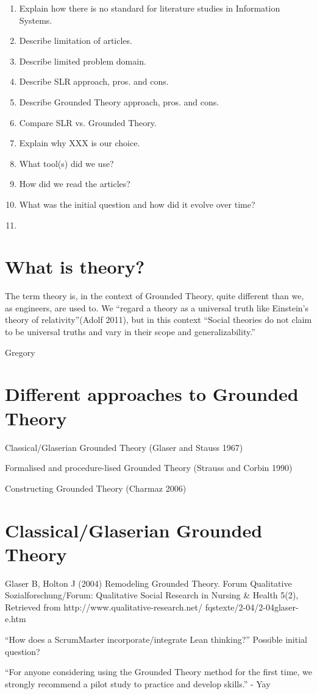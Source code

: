 \begin{enumerate}
	\item Explain how there is no standard for literature studies in Information Systems.
	\item Describe limitation of articles.
	\item Describe limited problem domain.
	\item Describe SLR approach, pros. and cons.
	\item Describe Grounded Theory approach, pros. and cons.
	\item Compare SLR vs. Grounded Theory.
	\item Explain why XXX is our choice.
	
	
	
	\item What tool(s) did we use?
	\item How did we read the articles?
	\item What was the initial question and how did it evolve over time?
	\item 
\end{enumerate}


\section{What is theory?}
The term theory is, in the context of Grounded Theory, quite different than we, as engineers, are used to. We “regard a theory as a universal truth like Einstein’s theory of relativity”(Adolf 2011), but in this context “Social theories do not claim to be universal truths and vary in their scope and generalizability.”


Gregory



\section{Different approaches to Grounded Theory}
Classical/Glaserian Grounded Theory (Glaser and Stauss 1967)

Formalised and procedure-lised Grounded Theory (Strauss and Corbin 1990)

Constructing Grounded Theory (Charmaz 2006)

 


\section{Classical/Glaserian Grounded Theory}
Glaser B, Holton J (2004) Remodeling Grounded Theory. Forum Qualitative Sozialforschung/Forum:
Qualitative Social Research in Nursing \& Health 5(2), Retrieved from http://www.qualitative-research.net/
fqstexte/2-04/2-04glaser-e.htm





“How does a ScrumMaster incorporate/integrate Lean thinking?” Possible initial question?

“For anyone considering using the Grounded Theory method for the first time, we strongly
recommend a pilot study to practice and develop skills.” - Yay
